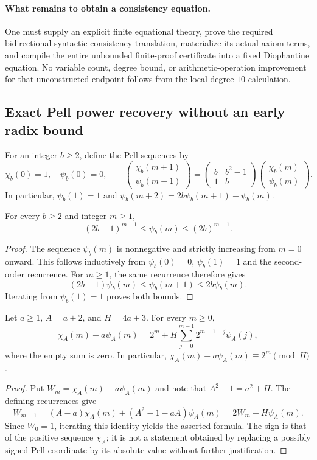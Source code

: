 \paragraph{What remains to obtain a consistency equation.}
One must supply an explicit finite equational theory, prove the required
bidirectional syntactic consistency translation, materialize its actual
axiom terms, and compile the entire unbounded finite-proof certificate
into a fixed Diophantine equation.  No variable count, degree bound, or
arithmetic-operation improvement for that unconstructed endpoint follows
from the local degree-$10$ calculation.

\subsection{Exact Pell power recovery without an early radix bound}

For an integer $b\ge2$, define the Pell sequences by
\[
 \chi_b(0)=1,\quad \psi_b(0)=0,\qquad
 \begin{pmatrix}\chi_b(m+1)\\\psi_b(m+1)\end{pmatrix}
 =
 \begin{pmatrix}b&b^2-1\\1&b\end{pmatrix}
 \begin{pmatrix}\chi_b(m)\\\psi_b(m)\end{pmatrix}.
\]
In particular, $\psi_b(1)=1$ and
$\psi_b(m+2)=2b\psi_b(m+1)-\psi_b(m)$.

\begin{auxsyntaxlem}
For every $b\ge2$ and integer $m\ge1$,
\[
 (2b-1)^{m-1}\le\psi_b(m)\le(2b)^{m-1}.
\]
\end{auxsyntaxlem}
\begin{proof}
The sequence $\psi_b(m)$ is nonnegative and strictly increasing from
$m=0$ onward.  This follows inductively from
$\psi_b(0)=0$, $\psi_b(1)=1$ and the second-order recurrence.  For
$m\ge1$, the same recurrence therefore gives
\[
 (2b-1)\psi_b(m)
 \le\psi_b(m+1)
 \le2b\psi_b(m).
\]
Iterating from $\psi_b(1)=1$ proves both bounds.
\end{proof}

\begin{auxsyntaxlem}
\label{lem:pell-quotient-exact}
Let $a\ge1$, $A=a+2$, and $H=4a+3$.  For every $m\ge0$,
\[
 \chi_A(m)-a\psi_A(m)
 =2^m+H\sum_{j=0}^{m-1}2^{m-1-j}\psi_A(j),
\]
where the empty sum is zero.  In particular,
$\chi_A(m)-a\psi_A(m)\equiv2^m\pmod H$.
\end{auxsyntaxlem}
\begin{proof}
Put $W_m=\chi_A(m)-a\psi_A(m)$ and note that
$A^2-1=a^2+H$.  The defining recurrences give
\[
 W_{m+1}
 =(A-a)\chi_A(m)+(A^2-1-aA)\psi_A(m)
 =2W_m+H\psi_A(m).
\]
Since $W_0=1$, iterating this identity yields the asserted formula.
The sign is that of the positive sequence $\chi_A$; it is not a
statement obtained by replacing a possibly signed Pell coordinate by
its absolute value without further justification.
\end{proof}


